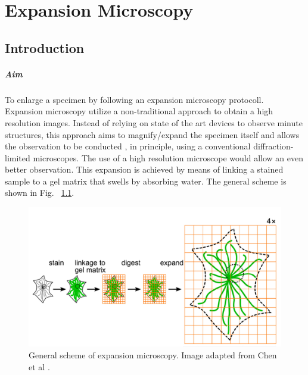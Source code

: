 
\chapter{Expansion Microscopy}
\label{chp:Expansion}

\section{Introduction}

\paragraph{Aim} To enlarge a specimen by following an expansion microscopy protocoll.
\\

Expansion microscopy utilize a non-traditional approach to obtain a high resolution images. 
Instead of relying on state of the art devices to observe minute structures, this approach aims to magnify/expand the specimen itself and allows the observation to be conducted , in principle, using a conventional diffraction-limited microscopes. 
The use of a high resolution microscope would allow an even better observation. 
This expansion is achieved by means of linking a stained sample to a gel matrix that swells by absorbing water. 
The general scheme is shown in Fig. ~\ref{fig:exmgensch}.

\begin{figure}[h!]
\centering
\includegraphics[width=.6\columnwidth]{Exp_5_Expansion/Figures/genscheme}
\caption{General scheme of expansion microscopy. Image adapted from Chen et al \cite{Chen2015}.} 
\label{fig:exmgensch}
\end{figure}
